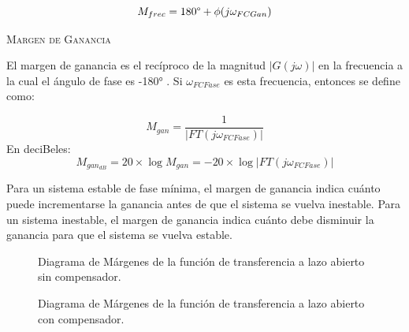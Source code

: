 \documentclass[a4paper,11pt]{article}
\begin{document}
$$M_{frec}=180\degree+\phi(j\omega_{FCGan})$$

\textsc{Margen de Ganancia}

El margen de ganancia es el recíproco de la magnitud $|G(j\omega)|$ en la frecuencia a la cual el ángulo de fase es -180° . Si $\omega_{FCFase}$ es esta frecuencia, entonces se define como:

$$M_{gan}=\frac{1}{|FT(j\omega_{FCFase})|}$$
En deciBeles:\\
$$M_{gan_{dB}}=20\times\log M_{gan}=-20\times\log|FT(j\omega_{FCFase})|$$

Para un sistema estable de fase mínima, el margen de ganancia indica cuánto puede incrementarse la ganancia antes de que el sistema se vuelva inestable. Para un sistema inestable, el margen de ganancia indica cuánto debe disminuir la ganancia para que el sistema se vuelva estable.

	\begin{figure}[H] %
	\caption{Diagrama de Márgenes de la función de transferencia a lazo abierto sin compensador.}
	\label{fig:bode_la}
	\end{figure}
	
	\begin{figure}[H] %
	\caption{Diagrama de Márgenes de la función de transferencia a lazo abierto con compensador.}
	\label{fig:bode_la_comp}
	\end{figure}
	
\end{document}
